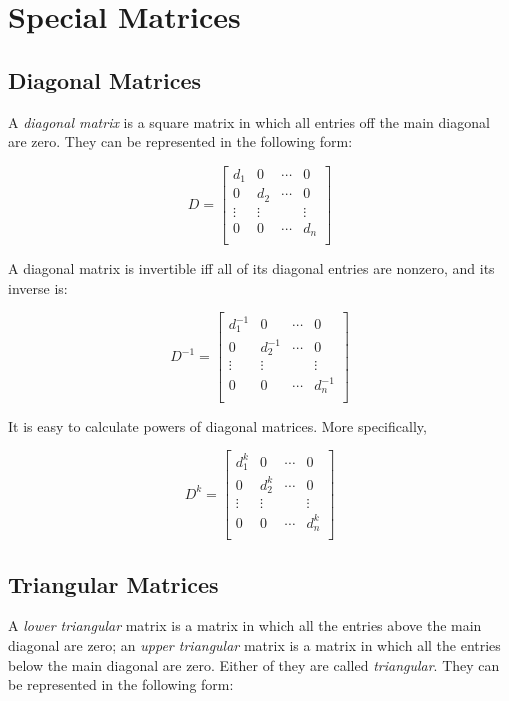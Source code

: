 \documentclass{report}
\begin{document}
	
	\section{Special Matrices}
		\subsection{Diagonal Matrices}
		A \emph{diagonal matrix} is a square matrix in which all entries off the main diagonal are zero. They can be represented in the following form:
		
		\begin{displaymath}
		D=
		\begin{bmatrix}
		d_1 & 0 & \cdots & 0 \\
		0 & d_2 & \cdots & 0 \\
		\vdots & \vdots &        & \vdots \\
		0 & 0 & \cdots & d_n \\
		\end{bmatrix}
		\end{displaymath}
		
		A diagonal matrix is invertible iff all of its diagonal entries are nonzero, and its inverse is:
		
		\begin{displaymath}
		D^{-1}=
		\begin{bmatrix}
		d_1^{-1} & 0 & \cdots & 0 \\
		0 & d_2^{-1} & \cdots & 0 \\
		\vdots & \vdots &        & \vdots \\
		0 & 0 & \cdots & d_n^{-1} \\
		\end{bmatrix}
		\end{displaymath}
		
		It is easy to calculate powers of diagonal matrices. More specifically,
		
		\begin{displaymath}
		D^{k}=
		\begin{bmatrix}
		d_1^{k} & 0 & \cdots & 0 \\
		0 & d_2^{k} & \cdots & 0 \\
		\vdots & \vdots &        & \vdots \\
		0 & 0 & \cdots & d_n^{k} \\
		\end{bmatrix}
		\end{displaymath}
		
		\subsection{Triangular Matrices}
		A \emph{lower triangular} matrix is a matrix in which all the entries above the main diagonal are zero; an \emph{upper triangular} matrix is a matrix in which all the entries below the main diagonal are zero. Either of they are called \emph{triangular}. They can be represented in the following form:
		
\end{document}
